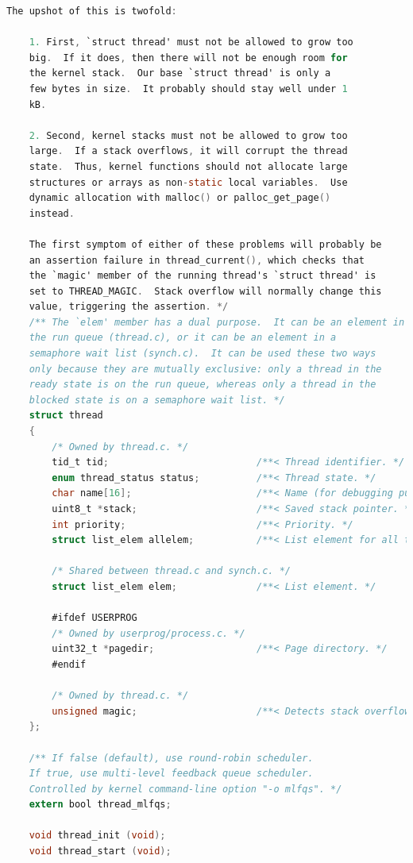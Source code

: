 \documentclass{article}
\begin{document}
\begin{lstlisting}[language=C, title=\texttt{thread.h}]
	The upshot of this is twofold:
	
	1. First, `struct thread' must not be allowed to grow too
	big.  If it does, then there will not be enough room for
	the kernel stack.  Our base `struct thread' is only a
	few bytes in size.  It probably should stay well under 1
	kB.
	
	2. Second, kernel stacks must not be allowed to grow too
	large.  If a stack overflows, it will corrupt the thread
	state.  Thus, kernel functions should not allocate large
	structures or arrays as non-static local variables.  Use
	dynamic allocation with malloc() or palloc_get_page()
	instead.
	
	The first symptom of either of these problems will probably be
	an assertion failure in thread_current(), which checks that
	the `magic' member of the running thread's `struct thread' is
	set to THREAD_MAGIC.  Stack overflow will normally change this
	value, triggering the assertion. */
	/** The `elem' member has a dual purpose.  It can be an element in
	the run queue (thread.c), or it can be an element in a
	semaphore wait list (synch.c).  It can be used these two ways
	only because they are mutually exclusive: only a thread in the
	ready state is on the run queue, whereas only a thread in the
	blocked state is on a semaphore wait list. */
	struct thread
	{
		/* Owned by thread.c. */
		tid_t tid;                          /**< Thread identifier. */
		enum thread_status status;          /**< Thread state. */
		char name[16];                      /**< Name (for debugging purposes). */
		uint8_t *stack;                     /**< Saved stack pointer. */
		int priority;                       /**< Priority. */
		struct list_elem allelem;           /**< List element for all threads list. */
		
		/* Shared between thread.c and synch.c. */
		struct list_elem elem;              /**< List element. */
		
		#ifdef USERPROG
		/* Owned by userprog/process.c. */
		uint32_t *pagedir;                  /**< Page directory. */
		#endif
		
		/* Owned by thread.c. */
		unsigned magic;                     /**< Detects stack overflow. */
	};
	
	/** If false (default), use round-robin scheduler.
	If true, use multi-level feedback queue scheduler.
	Controlled by kernel command-line option "-o mlfqs". */
	extern bool thread_mlfqs;
	
	void thread_init (void);
	void thread_start (void);
	

\end{lstlisting}
\end{document}

